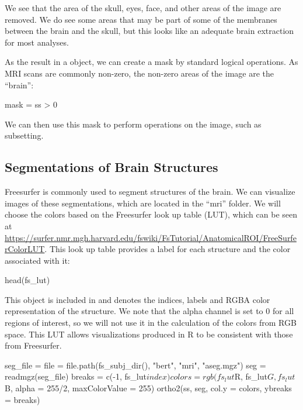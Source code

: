 We see that the area of the skull, eyes, face, and other areas of the
image are removed. We do see some areas that may be part of some of the
membranes between the brain and the skull, but this looks like an
adequate brain extraction for most analyses.

As the result in a  object, we can create a mask by standard
logical operations. As MRI scans are commonly non-zero, the non-zero
areas of the image are the ``brain'':

\begin{Schunk}
\begin{Sinput}
mask = ss > 0
\end{Sinput}
\end{Schunk}

We can then use this mask to perform operations on the image, such as
subsetting.

\subsection{Segmentations of Brain
Structures}\label{segmentations-of-brain-structures}

Freesurfer is commonly used to segment structures of the brain. We can
visualize images of these segmentations, which are located in the
``mri'' folder. We will choose the colors based on the Freesurfer look
up table (LUT), which can be seen at
\url{https://surfer.nmr.mgh.harvard.edu/fswiki/FsTutorial/AnatomicalROI/FreeSurferColorLUT}.
This look up table provides a label for each structure and the color
associated with it:

\begin{Schunk}
\begin{Sinput}
head(fs_lut)
\end{Sinput}
\end{Schunk}

This object is included in  and denotes the indices,
labels and RGBA color representation of the structure. We note that the
alpha channel is set to \(0\) for all regions of interest, so we will
not use it in the calculation of the colors from RGB space. This LUT
allows visualizations produced in R to be consistent with those from
Freesurfer.\\

\begin{Schunk}
\begin{Sinput}
seg_file = file = file.path(fs_subj_dir(), "bert", "mri", "aseg.mgz")
seg = readmgz(seg_file)
breaks = c(-1, fs_lut$index)
colors = rgb(fs_lut$R, fs_lut$G, fs_lut$B, 
             alpha = 255/2,
             maxColorValue = 255)
ortho2(ss, seg, col.y = colors, ybreaks = breaks)
\end{Sinput}
\end{Schunk}

